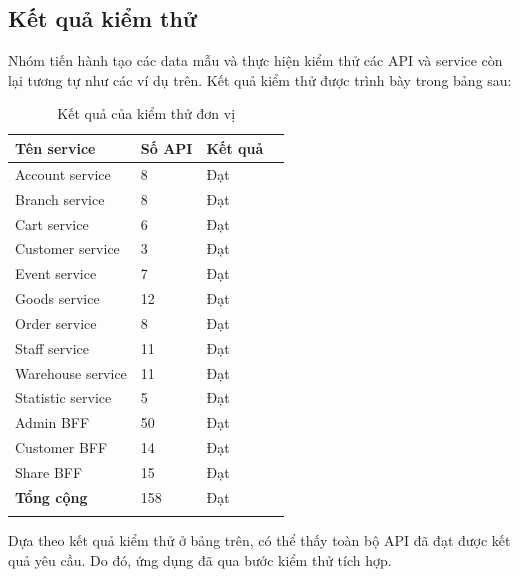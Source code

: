 \subsection{Kết quả kiểm thử}
Nhóm tiến hành tạo các data mẫu và thực hiện kiểm thử các API và service còn lại tương tự như các ví dụ trên. Kết quả kiểm thử được trình bày trong bảng sau:
\setlength\extrarowheight{6pt}
    \begin{longtable}{| p{4cm}| p{4cm}| p{4cm}| p{4cm} |}
        \hline
        \textbf{Tên service} &  \textbf{Số API}  & \textbf{Kết quả} \\
        \hline
        Account service  &  8              & Đạt             \\
        \hline
        Branch service  &  8              & Đạt             \\
        \hline
        Cart service  &  6               & Đạt             \\
        \hline
        Customer service  &  3              & Đạt             \\
        \hline
        Event service  &   7               & Đạt             \\
        \hline
        Goods service  &   12               & Đạt             \\
        \hline
        Order service  &   8              & Đạt             \\
        \hline
        Staff service  &  11               & Đạt             \\
        \hline
        Warehouse service  & 11             & Đạt             \\
        \hline
        Statistic service  &  5              & Đạt             \\
        \hline
        Admin BFF  &  50              & Đạt             \\
        \hline
        Customer BFF  &  14             & Đạt             \\
        \hline
        Share BFF  &  15              & Đạt             \\
        \hline
        \textbf{Tổng cộng}  &  158              & Đạt             \\
        \hline
        \caption{Kết quả của kiểm thử đơn vị}
    \end{longtable} 
    Dựa theo kết quả kiểm thử ở bảng trên, có thể thấy toàn bộ API đã đạt được kết quả yêu cầu. Do đó, ứng dụng đã qua bước kiểm thử tích hợp.

